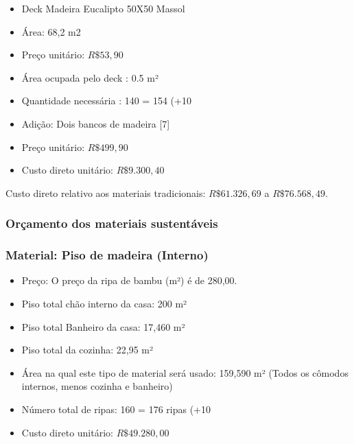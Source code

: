\begin{itemize}

		\item Deck Madeira Eucalipto 50X50 Massol

		\item Área: 68,2 m2

		\item Preço unitário: $R\$ 53 ,90$

		\item Área ocupada pelo deck : 0.5 m²

		\item Quantidade necessária : 140 = 154 (+10%

		\item Adição: Dois bancos de madeira [7]
		
		\item Preço unitário: $R\$ 499,90$

		\item Custo direto unitário: $R\$ 9.300,40$

\end{itemize}

Custo direto relativo aos materiais tradicionais: $R\$ 61.326,69$ a $R\$76.568,49$.

\subsubsection*{\textbf{Orçamento dos materiais sustentáveis}}

\subsubsection*{\textbf{Material: Piso de madeira (Interno)}}


\begin{itemize}

		\item Preço: O preço da ripa de bambu (m²) é de 280,00.

		\item Piso total chão interno da casa: 200 m²

		\item Piso total Banheiro da casa: 17,460 m²
 
		\item Piso total da cozinha: 22,95 m²

		\item Área na qual este tipo de material será usado: 159,590 m² (Todos os cômodos internos, menos cozinha e banheiro)

		\item Número total de ripas: 160 = 176 ripas (+10%

		\item Custo direto unitário: $R\$49.280,00$

\end{itemize}

